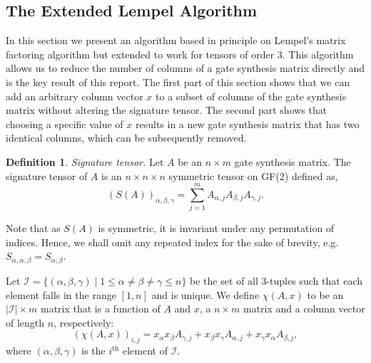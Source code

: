 \documentclass{article}
\theoremstyle{definition}
\newtheorem{definition}{Definition}[section]
\theoremstyle{problem}
\theoremstyle{lemma}
\begin{document}
		
		
		\FloatBarrier
		\subsection{The Extended Lempel Algorithm}
		In this section we present an algorithm based in principle on Lempel's matrix factoring algorithm but extended to work for tensors of order 3. This algorithm allows us to reduce the number of columns of a gate synthesis matrix directly and is the key result of this report. The first part of this section shows that we can add an arbitrary column vector $x$ to a subset of columns of the gate synthesis matrix without altering the signature tensor. The second part shows that choosing a specific value of $x$ results in a new gate synthesis matrix that has two identical columns, which can be subsequently removed.
		
		
		
		
		
		
		\theoremstyle{definition}
		\begin{definition}{\emph{Signature tensor.}}
			Let $A$ be an $n \times m$ gate synthesis matrix. The signature tensor of $A$ is an $n \times n \times n$ symmetric tensor on GF(2) defined as,
			\begin{equation}
			\label{e_Sig}
			\left(S(A)\right)_{\alpha,\beta,\gamma} = \sum_{j = 1}^{m}A_{\alpha,j}A_{\beta,j}A_{\gamma,j}.
			\end{equation}
		\end{definition}
	
		Note that as $S(A)$ is symmetric, it is invariant under any permutation of indices. Hence, we shall omit any repeated index for the sake of brevity, e.g. $S_{\alpha, \alpha, \beta} = S_{\alpha,\beta}$.
		
		Let $\mathcal{I} = \{\left(\alpha,\beta,\gamma\right)\mid 1 \leq \alpha \neq \beta \neq \gamma \leq n\}$ be the set of all 3-tuples such that each element falls in the range $\left[1,n\right]$ and is unique. We define $\chi(A,x)$ to be an $|\mathcal{I}| \times m$ matrix that is a function of $A$ and $x$, a $n \times m$ matrix and a column vector of length $n$, respectively:
		\begin{equation}
		\label{e_chi}
		\left(\chi(A,x)\right)_{i,j} = x_\alpha x_\beta A_{\gamma,j} + x_\beta x_\gamma A_{\alpha,j} + x_\gamma x_\alpha A_{\beta,j},
		\end{equation}
		where $\left(\alpha,\beta,\gamma\right)$ is the $i^\text{th}$ element of $\mathcal{I}$.
		
\end{document}
